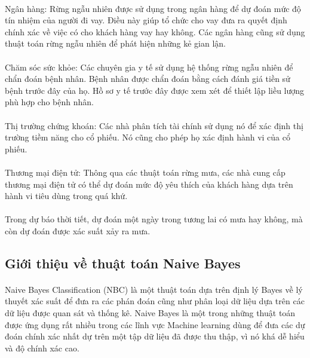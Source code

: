 \documentclass{article}
\begin{document}
\paragraph{}Ngân hàng: Rừng ngẫu nhiên được sử dụng trong ngân hàng để dự đoán mức độ tín nhiệm của người đi vay. Điều này giúp tổ chức cho vay đưa ra quyết định chính xác về việc có cho khách hàng vay hay không. Các ngân hàng cũng sử dụng thuật toán rừng ngẫu nhiên để phát hiện những kẻ gian lận.
\paragraph{}Chăm sóc sức khỏe: Các chuyên gia y tế sử dụng hệ thống rừng ngẫu nhiên để chẩn đoán bệnh nhân. Bệnh nhân được chẩn đoán bằng cách đánh giá tiền sử bệnh trước đây của họ. Hồ sơ y tế trước đây được xem xét để thiết lập liều lượng phù hợp cho bệnh nhân.
\paragraph{}Thị trường chứng khoán: Các nhà phân tích tài chính sử dụng nó để xác định thị trường tiềm năng cho cổ phiếu. Nó cũng cho phép họ xác định hành vi của cổ phiếu.
\paragraph{}Thương mại điện tử: Thông qua các thuật toán rừng mưa, các nhà cung cấp thương mại điện tử có thể dự đoán mức độ yêu thích của khách hàng dựa trên hành vi tiêu dùng trong quá khứ.
\paragraph{}Trong dự báo thời tiết, dự đoán một ngày trong tương lai có mưa hay không, mà còn dự đoán được xác suất xảy ra mưa.
\subsection{Giới thiệu về thuật toán Naive Bayes}
\paragraph{}Naive Bayes Classification (NBC) là một thuật toán dựa trên định lý Bayes về lý thuyết xác suất để đưa ra các phán đoán cũng như phân loại dữ liệu dựa trên các dữ liệu được quan sát và thống kê. Naive Bayes là một trong những thuật toán được ứng dụng rất nhiều trong các lĩnh vực Machine learning dùng để đưa các dự đoán chính xác nhất dự trên một tập dữ liệu đã được thu thập, vì nó khá dễ hiểu và độ chính xác cao.
\end{document}
